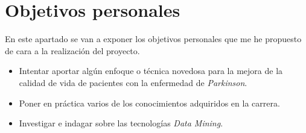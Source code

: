 \section{Objetivos personales}
En este apartado se van a exponer los objetivos personales que me he propuesto de cara a la realización del proyecto. 
\begin{itemize}
    \item Intentar aportar algún enfoque o técnica novedosa para la mejora de la calidad de vida de pacientes con la enfermedad de \textit{Parkinson}.
    \item Poner en práctica varios de los conocimientos adquiridos en la carrera.
    \item Investigar e indagar sobre las tecnologías \textit{Data Mining}.
    
\end{itemize}
